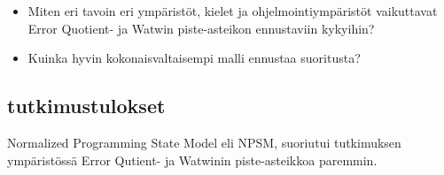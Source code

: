 \begin{itemize}
    \item Miten eri tavoin eri ympäristöt, kielet ja ohjelmointiympäristöt vaikuttavat Error Quotient\cite{jadud2006methods}- ja Watwin\cite{watson2014no} piste-asteikon ennustaviin kykyihin?
    \item Kuinka hyvin kokonaisvaltaisempi malli ennustaa suoritusta?
\end{itemize}


\subsection{tutkimustulokset}

Normalized Programming State Model eli NPSM, suoriutui tutkimuksen\cite{carter2015normalized} ympäristössä Error Qutient- ja Watwinin piste-asteikkoa paremmin.

